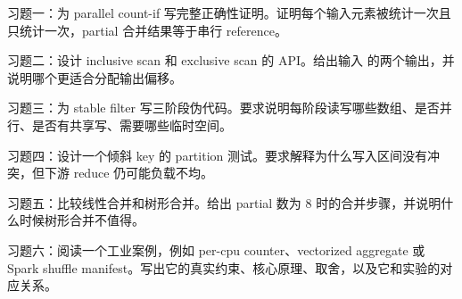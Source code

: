 \begin{exercisebox}
习题一：为 parallel count-if 写完整正确性证明。证明每个输入元素被统计一次且只统计一次，partial 合并结果等于串行 reference。

习题二：设计 inclusive scan 和 exclusive scan 的 API。给出输入 \code{[3, 1, 4]} 的两个输出，并说明哪个更适合分配输出偏移。

习题三：为 stable filter 写三阶段伪代码。要求说明每阶段读写哪些数组、是否并行、是否有共享写、需要哪些临时空间。

习题四：设计一个倾斜 key 的 partition 测试。要求解释为什么写入区间没有冲突，但下游 reduce 仍可能负载不均。

习题五：比较线性合并和树形合并。给出 partial 数为 8 时的合并步骤，并说明什么时候树形合并不值得。

习题六：阅读一个工业案例，例如 per-cpu counter、vectorized aggregate 或 Spark shuffle manifest。写出它的真实约束、核心原理、取舍，以及它和实验的对应关系。
\end{exercisebox}
